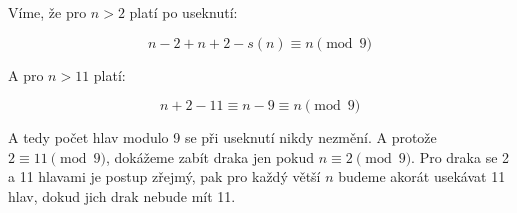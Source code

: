 \documentclass{fkssolpub}
\author{Ondřej Sedláček}
\begin{document}
Víme, že pro $n > 2$ platí po useknutí:

\[
  n - 2 + n + 2 - s(n) \equiv n \pmod{9}
\]

A pro $n > 11$ platí:

\[
  n + 2 - 11 \equiv n - 9 \equiv n \pmod{9}
\]

A tedy počet hlav modulo 9 se při useknutí nikdy nezmění. A protože $2 \equiv 11 \pmod{9}$, dokážeme zabít draka jen pokud $n \equiv 2 \pmod{9}$. Pro draka se 2 a 11 hlavami je postup zřejmý, pak pro každý větší $n$ budeme akorát usekávat 11 hlav, dokud jich drak nebude mít 11.
\end{document}
